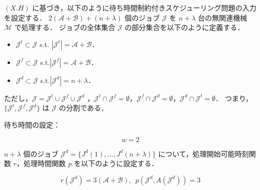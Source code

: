 \documentclass[12pt]{optlab-bachelor}
\begin{document}
$(X.H)$ に基づき，以下のように待ち時間制約付きスケジューリング問題の入力を設定する．
$2(\mathcal{A} + \mathcal{B}) + (n + \lambda)$ 個のジョブ $\mathcal{J}$ を
$n + \lambda$ 台の無関連機械 $\mathcal{M}$ で処理する．
ジョブの全体集合 $\mathcal{J}$ の部分集合を以下のように定義する．
\begin{itemize}
  \item $\mathcal{J}^t \subset \mathcal{J}$ s.t. $|\mathcal{J}^t| =
  \mathcal{A}  + \mathcal{B}$．
  \item $\mathcal{J}^f \subset \mathcal{J}$
  s.t.$|\mathcal{J}^f| = \mathcal{A}  + \mathcal{B}$．
  \item $\mathcal{J}^d \subset \mathcal{J}$ s.t.$|\mathcal{J}^d| =
  n + \lambda$．
\end{itemize}
ただし，$\mathcal{J} = \mathcal{J}^t \cup \mathcal{J}^f \cup
\mathcal{J}^d$ ，$\mathcal{J}^t \cap \mathcal{J}^f = \emptyset$，$\mathcal{J}^f \cap \mathcal{J}^d = \emptyset$，$\mathcal{J}^d \cap \mathcal{J}^t = \emptyset$．
つまり，$\{\mathcal{J}^t, \mathcal{J}^f,\mathcal{J}^d\}$ は $\mathcal{J}$ の分割である．

\newpage
\begin{description}
  \item[待ち時間の設定：]
\end{description}
\begin{displaymath}
  w = 2
\end{displaymath}


$n + \lambda$ 個のジョブ $\mathcal{J}^d = \{J^d(1),\ldots,J^d(n + \lambda)\}$ について，処理開始可能時刻関数 $r$，処理時間関数 $p$ を以下のように設定する．

\begin{displaymath}
  r(\mathcal{J}^d) = 3(\mathcal{A} + \mathcal{B})
  ,\ \ p(\mathcal{J}^d, A(\mathcal{J}^d)) = 3
\end{displaymath}
\end{document}
